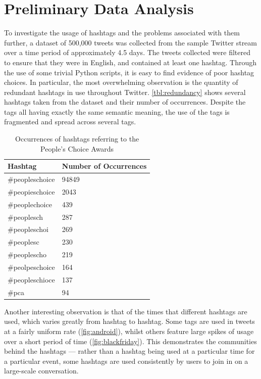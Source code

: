 \documentclass[12pt,a4paper]{article}
\begin{document}
\pagebreak

\section{Preliminary Data Analysis}

To investigate the usage of hashtags and the problems associated with them further, a dataset of 500,000 tweets was collected from the sample Twitter stream over a time period of approximately 4.5 days. The tweets collected were filtered to ensure that they were in English, and contained at least one hashtag. Through the use of some trivial Python scripts, it is easy to find evidence of poor hashtag choices. In particular, the most overwhelming observation is the quantity of redundant hashtags in use throughout Twitter. \autoref{tbl:redundancy} shows several hashtags taken from the dataset and their number of occurrences. Despite the tags all having exactly the same semantic meaning, the use of the tags is fragmented and spread across several tags.

\begin{table}[H]
\centering
\begin{tabular}{| l | l |}
    \hline
    \textbf{Hashtag} & \textbf{Number of Occurrences} \\
    \hline \hline
    \#peopleschoice & 94849 \\ \hline
    \#peopieschoice & 2043 \\ \hline
    \#peoplechoice  & 439 \\ \hline
    \#peoplesch     & 287 \\ \hline
    \#peopleschoi   & 269 \\ \hline
    \#peoplesc      & 230 \\ \hline
    \#peoplescho    & 219 \\ \hline
    \#peolpeschoice & 164 \\ \hline
    \#peopleschioce & 137 \\ \hline
    \#pca           & 94 \\ \hline
\end{tabular}
\caption{Occurrences of hashtags referring to the People's Choice Awards}
\label{tbl:redundancy}
\end{table}

Another interesting observation is that of the times that different hashtags are used, which varies greatly from hashtag to hashtag. Some tags are used in tweets at a fairly uniform rate (\autoref{fig:android}), whilst others feature large spikes of usage over a short period of time (\autoref{fig:blackfriday}). This demonstrates the communities behind the hashtags --- rather than a hashtag being used at a particular time for a particular event, some hashtags are used consistently by users to join in on a large-scale conversation.
\end{document}
